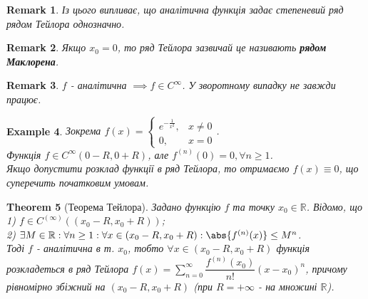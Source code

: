 \documentclass[a4paper, 10pt]{article}
\makeatletter
\def\huge{\displaystyle}
\def\qed{$\blacksquare$}
\theoremstyle{theoremdd}
\newtheorem{theorem}{Theorem}[subsection]
\theoremstyle{theoremdd}
\theoremstyle{theoremdd}
\theoremstyle{theoremdd}
\theoremstyle{theoremdd}
\newtheorem{example}[theorem]{Example}
\theoremstyle{theoremdd}
\theoremstyle{theoremdd}
\newtheorem{remark}[theorem]{Remark}
\theoremstyle{theoremdd}
\theoremstyle{theoremdd}
\renewenvironment{proof}[1][Proof.\\]{\par
\pushQED{\hfill \qed}%
\normalfont \topsep6\p@\@plus6\p@\relax
\trivlist
\item\relax
{\bfseries
#1\@addpunct{.}}\hspace\labelsep\ignorespaces
}{%
\popQED\endtrivlist\@endpefalse
}
\makeatother
\begin{document}
\begin{remark}
Із цього випливає, що аналітична функція задає степеневий ряд рядом Тейлора однозначно.
\end{remark}

\begin{remark}
Якщо $x_0 = 0$, то ряд Тейлора зазвичай це називають \textbf{рядом Маклорена}.
\end{remark}

\begin{remark}
$f$ - аналітична $\implies f \in C^\infty$. У зворотному випадку не завжди працює.
\end{remark}

\begin{example}
Зокрема $f(x) = \begin{cases} e^{-\frac{1}{x^2}}, & x \neq 0 \\ 0, & x = 0 \end{cases}$. \\
Функція $f \in C^\infty (0-R,0+R)$, але $f^{(n)}(0) = 0, \forall n \geq 1$.\\
Якщо допустити розклад функції в ряд Тейлора, то отримаємо $f(x) \equiv 0$, що суперечить початковим умовам.
\end{example}

\begin{theorem}[Теорема Тейлора]
Задано функцію $f$ та точку $x_0 \in \mathbb{R}$. Відомо, що\\
1) $f \in C^{(\infty)}((x_0-R,x_0+R))$;\\
2) $\exists M \in \mathbb{R}: \forall n \geq 1: \forall x \in (x_0-R, x_0+R): \abs{f^{(n)}(x)} \leq M^n$.\\
Тоді $f$ - аналітична в т. $x_0$, тобто $\forall x \in (x_0-R, x_0+R)$ функція розкладеться в ряд Тейлора $f(x) = \huge \sum_{n=0}^\infty \dfrac{f^{(n)}(x_0)}{n!}(x-x_0)^n$, причому рівномірно збіжний на $(x_0-R,x_0+R)$ (при $R = +\infty$ - на множині $\mathbb{R}$).
\end{theorem}
\end{document}
